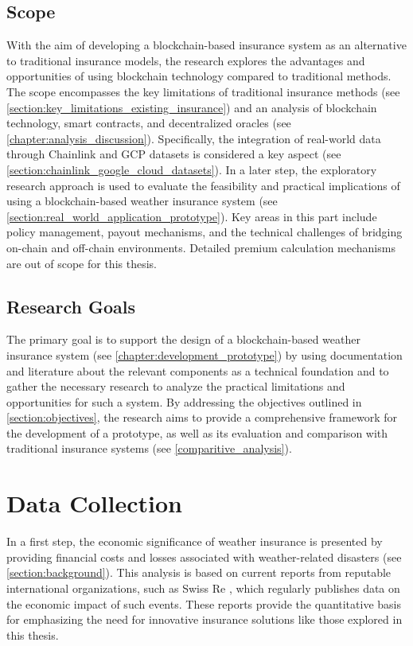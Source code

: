 \subsection{Scope}
With the aim of developing a blockchain-based insurance system as an alternative to traditional insurance models, the research explores the advantages and opportunities of using blockchain technology compared to traditional methods. The scope encompasses the key limitations of traditional insurance methods (see \cref{section:key_limitations_existing_insurance}) and an analysis of blockchain technology, smart contracts, and decentralized oracles (see \cref{chapter:analysis_discussion}). Specifically, the integration of real-world data through Chainlink and GCP datasets is considered a key aspect (see \cref{section:chainlink_google_cloud_datasets}). In a later step, the exploratory research approach is used to evaluate the feasibility and practical implications of using a blockchain-based weather insurance system (see \cref{section:real_world_application_prototype}). Key areas in this part include policy management, payout mechanisms, and the technical challenges of bridging on-chain and off-chain environments. Detailed premium calculation mechanisms are out of scope for this thesis.

\subsection{Research Goals}
The primary goal is to support the design of a blockchain-based weather insurance system (see \cref{chapter:development_prototype}) by using documentation and literature about the relevant components as a technical foundation and to gather the necessary research to analyze the practical limitations and opportunities for such a system. By addressing the objectives outlined in \cref{section:objectives}, the research aims to provide a comprehensive framework for the development of a prototype, as well as its evaluation and comparison with traditional insurance systems (see \cref{comparitive_analysis}).

\section{Data Collection}\label{section:data_collection}
In a first step, the economic significance of weather insurance is presented by providing financial costs and losses associated with weather-related disasters (see \cref{section:background}). This analysis is based on current reports from reputable international organizations, such as Swiss Re \autocite{swissre2017}, which regularly publishes data on the economic impact of such events. These reports provide the quantitative basis for emphasizing the need for innovative insurance solutions like those explored in this thesis.

